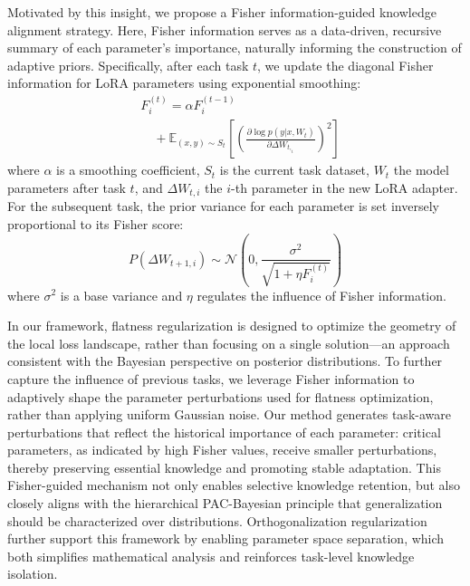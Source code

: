 \documentclass[letterpaper]{article} %
\begin{document}
Motivated by this insight, we propose a Fisher information-guided knowledge alignment strategy. Here, Fisher information serves as a data-driven, recursive summary of each parameter's importance, naturally informing the construction of adaptive priors. Specifically, after each task $t$, we update the diagonal Fisher information for LoRA parameters using exponential smoothing:
$$
\begin{aligned}
  &F^{(t)}_i = \alpha F^{(t-1)}_i  \\
  & \quad+ \mathbb{E}_{(x, y) \sim S_t} \left[ \left( \frac{\partial \log p(y|x, W_{t})}{\partial \Delta W_{t,_i}} \right)^2 \right] 
\end{aligned}
$$
where $\alpha$ is a smoothing coefficient, $S_t$ is the current task dataset, $W_t$ the model parameters after task $t$, and $\Delta W_{t,i}$ the $i$-th parameter in the new LoRA adapter. For the subsequent task, the prior variance for each parameter is set inversely proportional to its Fisher score:
$$
P(\Delta W_{t+1,i}) \sim \mathcal{N}\left(0, \frac{\sigma^2}{\sqrt{1+\eta F^{(t)}_i}}\right)
$$
where $\sigma^2$ is a base variance and $\eta$ regulates the influence of Fisher information.

In our framework, flatness regularization is designed to optimize the geometry of the local loss landscape, rather than focusing on a single solution—an approach consistent with the Bayesian perspective on posterior distributions. To further capture the influence of previous tasks, we leverage Fisher information to adaptively shape the parameter perturbations used for flatness optimization, rather than applying uniform Gaussian noise. Our method generates task-aware perturbations that reflect the historical importance of each parameter: critical parameters, as indicated by high Fisher values, receive smaller perturbations, thereby preserving essential knowledge and promoting stable adaptation. This Fisher-guided mechanism not only enables selective knowledge retention, but also closely aligns with the hierarchical PAC-Bayesian principle that generalization should be characterized over distributions. Orthogonalization regularization further support this framework by enabling parameter space separation, which both simplifies mathematical analysis and reinforces task-level knowledge isolation.
\end{document}
